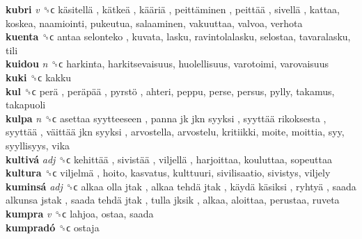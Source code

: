 \textbf{kubri} \emph{v}  ␝ϲ   käsitellä ,  kätkeä ,  kääriä ,  peittäminen ,  peittää ,  sivellä , kattaa, koskea, naamiointi, pukeutua, salaaminen, vakuuttaa, valvoa, verhota  \\
\textbf{kuenta} ␝ϲ   antaa selonteko , kuvata, lasku, ravintolalasku, selostaa, tavaralasku, tili  \\
\textbf{kuidou} \emph{n}  ␝ϲ  harkinta, harkitsevaisuus, huolellisuus, varotoimi, varovaisuus  \\
\textbf{kuki} ␝ϲ  kakku  \\
\textbf{kul} ␝ϲ   perä ,  peräpää ,  pyrstö , ahteri, peppu, perse, persus, pylly, takamus, takapuoli  \\
\textbf{kulpa} \emph{n}  ␝ϲ   asettaa syytteeseen ,  panna jk jkn syyksi ,  syyttää rikoksesta ,  syyttää ,  väittää jkn syyksi , arvostella, arvostelu, kritiikki, moite, moittia, syy, syyllisyys, vika  \\
\textbf{kultivá} \emph{adj}  ␝ϲ   kehittää ,  sivistää ,  viljellä , harjoittaa, kouluttaa, sopeuttaa  \\
\textbf{kultura} ␝ϲ   viljelmä , hoito, kasvatus, kulttuuri, sivilisaatio, sivistys, viljely  \\
\textbf{kuminsá} \emph{adj}  ␝ϲ   alkaa olla jtak ,  alkaa tehdä jtak ,  käydä käsiksi ,  ryhtyä ,  saada alkunsa jstak ,  saada tehdä jtak ,  tulla jksik , alkaa, aloittaa, perustaa, ruveta  \\
\textbf{kumpra} \emph{v}  ␝ϲ  lahjoa, ostaa, saada  \\
\textbf{kumpradó} ␝ϲ  ostaja  \\
